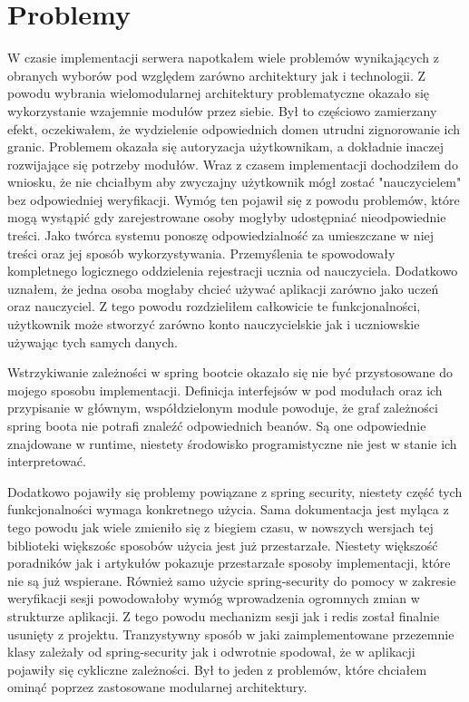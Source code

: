\section{Problemy}
W czasie implementacji serwera napotkałem wiele problemów wynikających z obranych wyborów pod względem zarówno architektury jak i technologii.
Z powodu wybrania wielomodularnej architektury problematyczne okazało się wykorzystanie wzajemnie modułów przez siebie.
Był to częściowo zamierzany efekt, oczekiwałem, że wydzielenie odpowiednich domen utrudni zignorowanie ich granic.
Problemem okazała się autoryzacja użytkownikam, a dokładnie inaczej rozwijające się potrzeby modułów.
Wraz z czasem implementacji dochodziłem do wniosku, że nie chciałbym aby zwyczajny użytkownik mógł zostać "nauczycielem" bez odpowiedniej weryfikacji.
Wymóg ten pojawił się z powodu problemów, które mogą wystąpić gdy zarejestrowane osoby mogłyby udostępniać nieodpowiednie treści.
Jako twórca systemu ponoszę odpowiedzialność za umieszczane w niej treści oraz jej sposób wykorzystywania.
Przemyślenia te spowodowały kompletnego logicznego oddzielenia rejestracji ucznia od nauczyciela.
Dodatkowo uznałem, że jedna osoba mogłaby chcieć używać aplikacji zarówno jako uczeń oraz nauczyciel.
Z tego powodu rozdzieliłem całkowicie te funkcjonalności, użytkownik może stworzyć zarówno konto nauczycielskie jak i uczniowskie używając tych samych danych.

Wstrzykiwanie zależności w spring bootcie okazało się nie być przystosowane do mojego sposobu implementacji.
Definicja interfejsów w pod modułach oraz ich przypisanie w głównym, współdzielonym module powoduje, że graf zależności spring boota nie potrafi znaleźć odpowiednich beanów.
Są one odpowiednie znajdowane w runtime, niestety środowisko programistyczne nie jest w stanie ich interpretować.

Dodatkowo pojawiły się problemy powiązane z spring security, niestety część tych funkcjonalności wymaga konkretnego użycia.
Sama dokumentacja jest myląca z tego powodu jak wiele zmieniło się z biegiem czasu, w nowszych wersjach tej biblioteki większośc sposobów użycia jest już przestarzałe.
Niestety większość poradników jak i artykułów pokazuje przestarzałe sposoby implementacji, które nie są już wspierane.
Również samo użycie spring-security do pomocy w zakresie weryfikacji sesji powodowałoby wymóg wprowadzenia ogromnych zmian w strukturze aplikacji.
Z tego powodu mechanizm sesji jak i redis został finalnie usunięty z projektu.
Tranzystywny sposób w jaki zaimplementowane przezemnie klasy zależały od spring-security jak i odwrotnie spodował, że w aplikacji pojawiły się cykliczne zależności.
Był to jeden z problemów, które chciałem ominąć poprzez zastosowane modularnej architektury.
